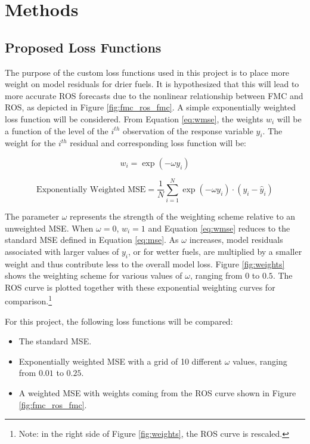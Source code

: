 \documentclass[11pt]{article}%
\begin{document}
\section{Methods}

\subsection{Proposed Loss Functions}

The purpose of the custom loss functions used in this project is to place more weight on model residuals for drier fuels. It is hypothesized that this will lead to more accurate ROS forecasts due to the nonlinear relationship between FMC and ROS, as depicted in Figure \ref{fig:fmc_ros_fmc}. A simple exponentially weighted loss function will be considered. From Equation \ref{eq:wmse}, the weights $w_i$ will be a function of the level of the $i^{th}$ observation of the response variable $y_i$. The weight for the $i^{th}$ residual and corresponding loss function will be:

\begin{equation}
    \label{eq:weights}
    w_i = \exp(-\omega y_i)
\end{equation}

\begin{equation}
    \label{eq:wloss}
    \text{Exponentially Weighted MSE} = \frac{1}{N}\sum_{i=1}^N \exp(-\omega y_i)\cdot (y_i - \hat y_i)
\end{equation}

The parameter $\omega$ represents the strength of the weighting scheme relative to an unweighted MSE. When $\omega = 0$, $w_i = 1$ and Equation \ref{eq:wmse} reduces to the standard MSE defined in Equation \ref{eq:mse}. As $\omega$ increases, model residuals associated with larger values of $y_i$, or for wetter fuels, are multiplied by a smaller weight and thus contribute less to the overall model loss. Figure \ref{fig:weights} shows the weighting scheme for various values of $\omega$, ranging from $0$ to $0.5$. The ROS curve is plotted together with these exponential weighting curves for comparison.\footnote{Note: in the right side of Figure \ref{fig:weights}, the ROS curve is rescaled.} 


For this project, the following loss functions will be compared:

\begin{itemize}
    \item The standard MSE.
    \item Exponentially weighted MSE with a grid of 10 different $\omega$ values, ranging from $0.01$ to $0.25$.
    \item A weighted MSE with weights coming from the ROS curve shown in Figure \ref{fig:fmc_ros_fmc}.
\end{itemize}
\end{document}
